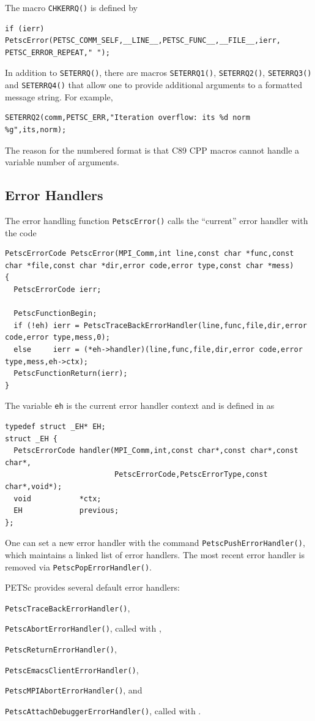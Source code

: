 The macro \lstinline{CHKERRQ()} is defined by
\begin{lstlisting}
if (ierr) PetscError(PETSC_COMM_SELF,__LINE__,PETSC_FUNC__,__FILE__,ierr, PETSC_ERROR_REPEAT," ");
\end{lstlisting}

In addition to \lstinline{SETERRQ()}, there are macros \lstinline{SETERRQ1()}, \lstinline{SETERRQ2()}, \lstinline{SETERRQ3()}
and \lstinline{SETERRQ4()} that allow one to provide additional arguments to a formatted message string. For example,
\begin{lstlisting}
SETERRQ2(comm,PETSC_ERR,"Iteration overflow: its %d norm %g",its,norm);
\end{lstlisting}
The reason for the numbered format is that C89 CPP macros cannot handle a variable number
of arguments.

\subsection{Error Handlers}
The error handling function \lstinline{PetscError()} calls the ``current'' error handler
with the code
\begin{lstlisting}
PetscErrorCode PetscError(MPI_Comm,int line,const char *func,const char *file,const char *dir,error code,error type,const char *mess)
{
  PetscErrorCode ierr;

  PetscFunctionBegin;
  if (!eh) ierr = PetscTraceBackErrorHandler(line,func,file,dir,error code,error type,mess,0);
  else     ierr = (*eh->handler)(line,func,file,dir,error code,error type,mess,eh->ctx);
  PetscFunctionReturn(ierr);
}
\end{lstlisting}
The variable \lstinline{eh} is the current error handler context and is defined in
 \href{http://www.mcs.anl.gov/petsc/petsc-master/src/sys/error/err.c.html}{} as
\begin{lstlisting}
typedef struct _EH* EH;
struct _EH {
  PetscErrorCode handler(MPI_Comm,int,const char*,const char*,const char*,
                         PetscErrorCode,PetscErrorType,const char*,void*);
  void           *ctx;
  EH             previous;
};
\end{lstlisting}

One can set a new error handler with the command \lstinline{PetscPushErrorHandler()},
which maintains a linked list of error handlers. 
The most recent error handler is removed
via \lstinline{PetscPopErrorHandler()}.

PETSc provides several default error handlers:
\begin{tightitemize}
  \item \lstinline{PetscTraceBackErrorHandler()}, 
  \item \lstinline{PetscAbortErrorHandler()}, called with ,
  \item \lstinline{PetscReturnErrorHandler()},
  \item \lstinline{PetscEmacsClientErrorHandler()}, 
  \item \lstinline{PetscMPIAbortErrorHandler()}, and
  \item \lstinline{PetscAttachDebuggerErrorHandler()}, called with .
\end{tightitemize}

